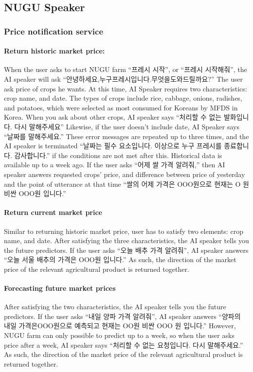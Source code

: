 \documentclass[conference]{IEEEtran}
\begin{document}
\subsection{NUGU Speaker}

\subsubsection{Price notification service}
\paragraph{ Return historic market price:}
When the user asks to start NUGU farm “프레시 시작”, or “프레시 시작해줘”, the AI speaker will ask “안녕하세요,누구프레시입니다.무엇을도와드릴까요?” The user ask price of crops he wants. At this time, AI Speaker requires two characteristics: crop name, and date. The types of crops include rice, cabbage, onions, radishes, and potatoes, which were selected as most consumed for Koreans by MFDS in Korea. When you ask about other crops, AI speaker says “처리할 수 없는 발화입니다. 다시 말해주세요” Likewise, if the user doesn’t include date, AI Speaker says “날짜를 말해주세요.” These error messages are repeated up to three times, and the AI speaker is terminated “날짜는 필수 요소입니다. 이상으로 누구 프레시를 종료합니다. 감사합니다.” if the conditions are not met after this. Historical data is available up to a week ago. If the user asks “어제 쌀 가격 알려줘,” then AI speaker answers requested crops’ price, and difference between price of yesterday and the point of utterance at that time “쌀의 어제 가격은 OOO원으로 현재는 O 원 비싼 OOO원 입니다.”

\paragraph{Return current market price}
Similar to returning historic market price, user has to satisfy two elements: crop name, and date. After satisfying the three characteristics, the AI speaker tells you the future predictors. If the user asks “오늘 배추 가격 알려줘”, AI speaker answers “오늘 서울 배추의 가격은 OOO원 입니다.” As such, the direction of the market price of the relevant agricultural product is returned together.

\paragraph{Forecasting future market prices}
After satisfying the two characteristics, the AI speaker tells you the future predictors. If the user asks “내일 양파 가격 알려줘”, AI speaker answers “양파의 내일 가격은OOO원으로 예측되고 현재는 OO원 비싼 OOO 원 입니다.” However, NUGU farm can only possible to predict up to a week, so when the user asks price after a week, AI speaker says “처리할 수 없는 요청입니다. 다시 말해주세요.” As such, the direction of the market price of the relevant agricultural product is returned together.
\end{document}
